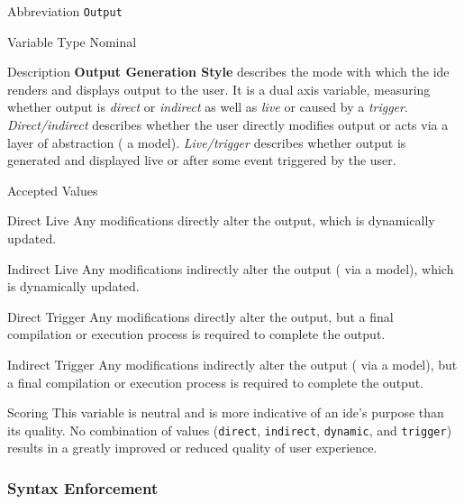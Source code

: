 \begin{AlignedDesc}
  \item[Abbreviation] \texttt{Output}

  \item[Variable Type] Nominal

  \item[Description] \textbf{Output Generation Style} describes the mode
  with which the \ac{ide} renders and displays output to the user. It is a
  dual axis variable, measuring whether output is \textit{direct} or
  \textit{indirect} as well as \textit{live} or caused by a
  \textit{trigger}. \textit{Direct/indirect} describes whether the user directly
  modifies output or acts via a layer of abstraction (\eg{} a
  model). \textit{Live/trigger} describes whether output is generated and
  displayed live or after some event triggered by the user.

  \item[Accepted Values]

  \begin{AlignedDesc}
    \item[Direct Live] Any modifications directly alter the output, which
    is dynamically updated.
    \item[Indirect Live] Any modifications indirectly alter the output
    (\eg{} via a model), which is dynamically updated.
    \item[Direct Trigger] Any modifications directly alter the output, but
    a final compilation or execution process is required to complete the
    output.
    \item[Indirect Trigger] Any modifications indirectly alter the output
    (\eg{} via a model), but a final compilation or execution process is
    required to complete the output.
  \end{AlignedDesc}

  \item[Scoring] This variable is neutral and is more indicative of an
  \ac{ide}'s purpose than its quality. No combination of values
  (\texttt{direct}, \texttt{indirect}, \texttt{dynamic}, and
  \texttt{trigger}) results in a greatly improved or reduced quality of
  user experience.

\end{AlignedDesc}

\subsubsection{Syntax Enforcement}
\label{subsubsec:syntax}

